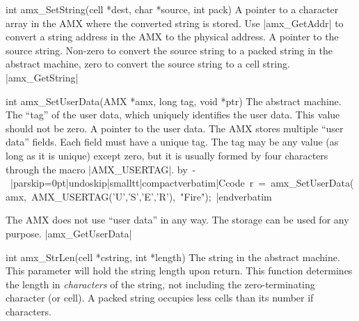 \syntaxp int amx_SetString(cell *dest, char *source, int pack)
        A pointer to a character array in the AMX where the converted string
        is stored. Use |amx_GetAddr| to convert a
        string address in the AMX to the physical address.
        A pointer to the source string.
        Non-zero to convert the source string to a packed string in the
        abstract machine, zero to convert the source string to a cell string.
\seealso |amx_GetString|

\syntaxp int amx_SetUserData(AMX *amx, long tag, void *ptr)
        The abstract machine.
        The ``tag'' of the user data, which uniquely identifies the user data.
        This value should not be zero.
        A pointer to the user data.
\notes
    The AMX stores multiple ``user data'' fields. Each field must have a unique
    tag. The tag may be any value (as long as it is unique) except zero, but it
    is usually formed by four characters through the macro |AMX_USERTAG|.
    \lbreak\hbox{\vbox{\advance \hsize by -\funrefindent \noindent
\listingx\verbatim|parskip=0pt|undoskip|smalltt|compactverbatim|Ccode
r = amx_SetUserData(amx, AMX_USERTAG('U','S','E','R'), "Fire");
|endverbatim\endlistingx
    }}%

    The AMX does not use ``user data'' in any way. The storage can be used for
    any purpose.
\seealso
    |amx_GetUserData|

\syntaxp int amx_StrLen(cell *cstring, int *length)
        The string in the abstract machine.
        This parameter will hold the string length upon return.
\notes
    This function determines the length in {\it characters\/} of the string,
    not including the zero-terminating character (or cell). A packed string
    occupies less cells than its number if characters.

